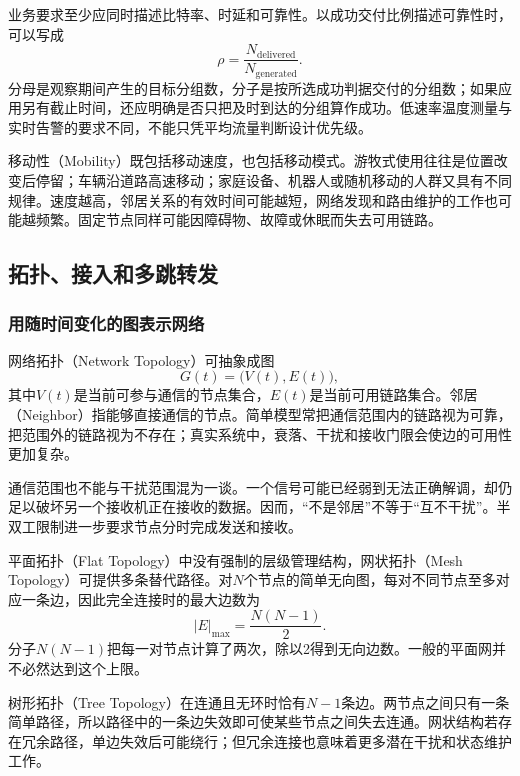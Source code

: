 业务要求至少应同时描述比特率、时延和可靠性。以成功交付比例描述可靠性时，可以写成
\begin{equation}
 \rho=\frac{N_{\mathrm{delivered}}}{N_{\mathrm{generated}}}.
\end{equation}
分母是观察期间产生的目标分组数，分子是按所选成功判据交付的分组数；如果应用另有截止时间，还应明确是否只把及时到达的分组算作成功。低速率温度测量与实时告警的要求不同，不能只凭平均流量判断设计优先级。

移动性（Mobility）既包括移动速度，也包括移动模式。游牧式使用往往是位置改变后停留；车辆沿道路高速移动；家庭设备、机器人或随机移动的人群又具有不同规律。速度越高，邻居关系的有效时间可能越短，网络发现和路由维护的工作也可能越频繁。固定节点同样可能因障碍物、故障或休眠而失去可用链路。

\subsection{拓扑、接入和多跳转发}

\subsubsection{用随时间变化的图表示网络}

网络拓扑（Network Topology）可抽象成图
\begin{equation}
 G(t)=\bigl(V(t),E(t)\bigr),
\end{equation}
其中$V(t)$是当前可参与通信的节点集合，$E(t)$是当前可用链路集合。邻居（Neighbor）指能够直接通信的节点。简单模型常把通信范围内的链路视为可靠，把范围外的链路视为不存在；真实系统中，衰落、干扰和接收门限会使边的可用性更加复杂。

通信范围也不能与干扰范围混为一谈。一个信号可能已经弱到无法正确解调，却仍足以破坏另一个接收机正在接收的数据。因而，“不是邻居”不等于“互不干扰”。半双工限制进一步要求节点分时完成发送和接收。

平面拓扑（Flat Topology）中没有强制的层级管理结构，网状拓扑（Mesh Topology）可提供多条替代路径。对$N$个节点的简单无向图，每对不同节点至多对应一条边，因此完全连接时的最大边数为
\begin{equation}
 |E|_{\max}=\frac{N(N-1)}{2}.
\end{equation}
分子$N(N-1)$把每一对节点计算了两次，除以2得到无向边数。一般的平面网并不必然达到这个上限。

树形拓扑（Tree Topology）在连通且无环时恰有$N-1$条边。两节点之间只有一条简单路径，所以路径中的一条边失效即可使某些节点之间失去连通。网状结构若存在冗余路径，单边失效后可能绕行；但冗余连接也意味着更多潜在干扰和状态维护工作。

